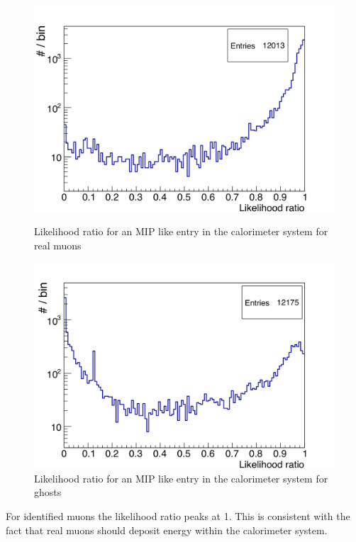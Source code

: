 \begin{figure}[htbp]
\centering
\begin{minipage}[ht]{0.475\textwidth}
\includegraphics[width=\textwidth]{Figures/scheuch/LikelihoodNonGhost.png}
\caption{Likelihood ratio for an MIP like entry in the calorimeter system for real muons}
\label{LikelihoodReal}
\end{minipage}
\hspace{0.5cm}
\begin{minipage}[ht]{0.475\textwidth}
\includegraphics[width=\textwidth]{Figures/scheuch/LikelihoodGhost.png}
\caption{Likelihood ratio for an MIP like entry in the calorimeter system for ghosts}
\label{LikelihoodGhost}
\end{minipage}
\end{figure}
For identified muons the likelihood ratio peaks at 1. This is consistent with the fact that real muons should deposit energy within the calorimeter system.\\
